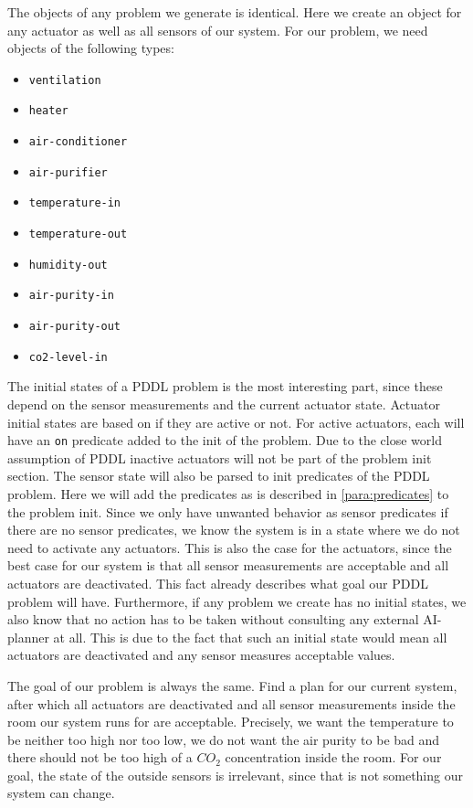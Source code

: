 \pagebreak

The objects of any problem we generate is identical.
Here we create an object for any actuator as well as all sensors of our system.
For our problem, we need objects of the following types:
\begin{itemize}
    \item \texttt{ventilation}
    \item \texttt{heater}
    \item \texttt{air-conditioner}
    \item \texttt{air-purifier}
    \item \texttt{temperature-in}
    \item \texttt{temperature-out}
    \item \texttt{humidity-out}
    \item \texttt{air-purity-in}
    \item \texttt{air-purity-out}
    \item \texttt{co2-level-in}
\end{itemize}

The initial states of a PDDL problem is the most interesting part, since these depend on the sensor measurements and the current actuator state.
Actuator initial states are based on if they are active or not.
For active actuators, each will have an \texttt{on} predicate added to the init of the problem.
Due to the close world assumption of PDDL inactive actuators will not be part of the problem init section.
The sensor state will also be parsed to init predicates of the PDDL problem.
Here we will add the predicates as is described in \cref{para:predicates} to the problem init.
Since we only have unwanted behavior as sensor predicates if there are no sensor predicates, we know the system is in a state where we do not need to activate any actuators.
This is also the case for the actuators, since the best case for our system is that all sensor measurements are acceptable and all actuators are deactivated.
This fact already describes what goal our PDDL problem will have.
Furthermore, if any problem we create has no initial states, we also know that no action has to be taken without consulting any external AI-planner at all.
This is due to the fact that such an initial state would mean all actuators are deactivated and any sensor measures acceptable values.

The goal of our problem is always the same.
Find a plan for our current system, after which all actuators are deactivated and all sensor measurements inside the room our system runs for are acceptable.
Precisely, we want the temperature to be neither too high nor too low, we do not want the air purity to be bad and there should not be too high of a $CO_2$ concentration inside the room.
For our goal, the state of the outside sensors is irrelevant, since that is not something our system can change.

